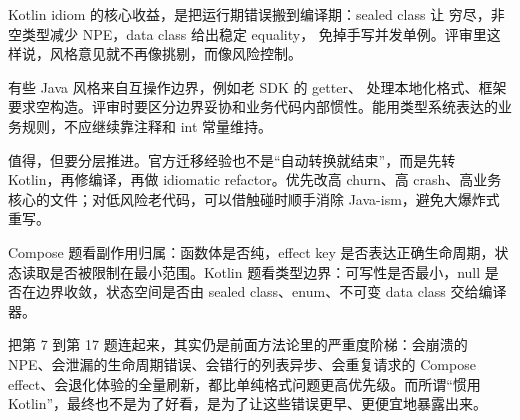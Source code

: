 \begin{idea}[惯用性的价值不是审美]
Kotlin idiom 的核心收益，是把运行期错误搬到编译期：sealed class 让  穷尽，非空类型减少 NPE，data class 给出稳定 equality， 免掉手写并发单例。评审里这样说，风格意见就不再像挑剔，而像风险控制。
\end{idea}

\begin{pitfall}
有些 Java 风格来自互操作边界，例如老 SDK 的 getter、 处理本地化格式、框架要求空构造。评审时要区分边界妥协和业务代码内部惯性。能用类型系统表达的业务规则，不应继续靠注释和 int 常量维持。
\end{pitfall}

\begin{followup}
值得，但要分层推进。官方迁移经验也不是“自动转换就结束”，而是先转 Kotlin，再修编译，再做 idiomatic refactor。优先改高 churn、高 crash、高业务核心的文件；对低风险老代码，可以借触碰时顺手消除 Java-ism，避免大爆炸式重写。
\end{followup}

\begin{keypoint}
Compose 题看副作用归属：函数体是否纯，effect key 是否表达正确生命周期，状态读取是否被限制在最小范围。Kotlin 题看类型边界：可写性是否最小，null 是否在边界收敛，状态空间是否由 sealed class、enum、不可变 data class 交给编译器。
\end{keypoint}

把第 7 到第 17 题连起来，其实仍是前面方法论里的严重度阶梯：会崩溃的 NPE、会泄漏的生命周期错误、会错行的列表异步、会重复请求的 Compose effect、会退化体验的全量刷新，都比单纯格式问题更高优先级。而所谓“惯用 Kotlin”，最终也不是为了好看，是为了让这些错误更早、更便宜地暴露出来。

